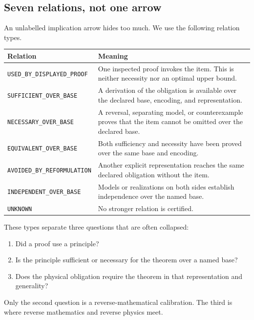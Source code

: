 \documentclass[11pt]{article}
\theoremstyle{definition}
\theoremstyle{remark}
\newcommand{\rtype}[1]{\nolinkurl{#1}}
\begin{document}
\subsection{Seven relations, not one arrow}

An unlabelled implication arrow hides too much.  We use the following relation
types.

\begin{center}
\small
\begin{tabularx}{\textwidth}{@{}Z Y@{}}
\toprule
Relation & Meaning \\
\midrule
\rtype{USED_BY_DISPLAYED_PROOF} & One inspected proof invokes the item.  This is neither necessity nor an optimal upper bound. \\
\rtype{SUFFICIENT_OVER_BASE} & A derivation of the obligation is available over the declared base, encoding, and representation. \\
\rtype{NECESSARY_OVER_BASE} & A reversal, separating model, or counterexample proves that the item cannot be omitted over the declared base. \\
\rtype{EQUIVALENT_OVER_BASE} & Both sufficiency and necessity have been proved over the same base and encoding. \\
\rtype{AVOIDED_BY_REFORMULATION} & Another explicit representation reaches the same declared obligation without the item. \\
\rtype{INDEPENDENT_OVER_BASE} & Models or realizations on both sides establish independence over the named base. \\
\rtype{UNKNOWN} & No stronger relation is certified. \\
\bottomrule
\end{tabularx}
\end{center}

These types separate three questions that are often collapsed:

\begin{enumerate}
\item Did a proof use a principle?
\item Is the principle sufficient or necessary for the theorem over a named
base?
\item Does the physical obligation require the theorem in that representation
and generality?
\end{enumerate}

Only the second question is a reverse-mathematical calibration.  The third is
where reverse mathematics and reverse physics meet.
\end{document}
